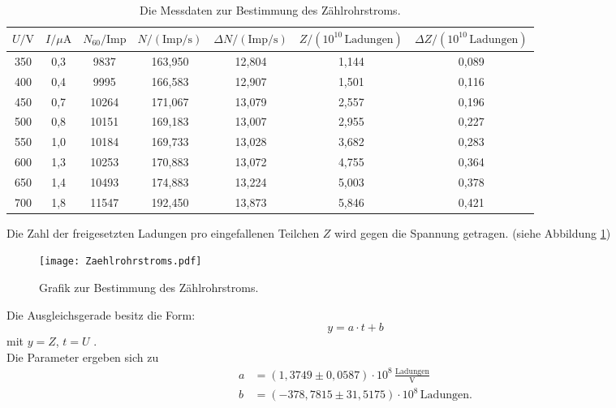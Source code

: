 \begin{table}[H]
  \centering
  \caption{Die Messdaten zur Bestimmung des Zählrohrstroms.}
  \label{tab:Zählrohrstroms}
  \begin{tabular}{| c | c |c|c|c|c|c| }
  \toprule
  $U/\mathrm{V}$ &$I/\mu \text{A} $& $N_{60}/\mathrm{Imp}$ & $N/\mathrm{(Imp/s)}$&$\Delta N/\mathrm{(Imp/s)}$ &$Z/\mathrm{(10^{10}\, Ladungen)}$&$\Delta Z/\mathrm{(10^{10}\, Ladungen)}$\\
  \midrule
  350&	0,3&	9837	&163,950	&12,804	&1,144	&0,089\\ 
  400&	0,4&	9995	&166,583	&12,907	&1,501	&0,116\\
  450&	0,7&	10264&	171,067&	13,079&	2,557&	0,196\\
  500&	0,8&	10151&	169,183&	13,007&	2,955&	0,227\\
  550&	1,0& 10184&	169,733&	13,028&	3,682&	0,283\\
  600&	1,3&	10253&	170,883&	13,072&	4,755&	0,364\\
  650&	1,4&	10493&	174,883&	13,224&	5,003&	0,378\\
  700&	1,8&	11547&	192,450&	13,873&	5,846&	0,421\\
  

  \bottomrule
  \end{tabular}
\end{table}
\noindent
Die Zahl der freigesetzten Ladungen pro eingefallenen Teilchen $Z$ wird gegen die Spannung getragen. (siehe Abbildung \ref{fig:Zaehlrohrstroms})
\begin{figure}[H]
  \centering
  \texttt{[image: Zaehlrohrstroms.pdf]}
  \caption{Grafik zur Bestimmung des Zählrohrstroms.}
  \label{fig:Zaehlrohrstroms}
\end{figure}
\noindent
Die Ausgleichsgerade besitz die Form:
\begin{equation}
 y=a\cdot t+b 
\end{equation}
mit \(y=Z\), \(t=U\) .\\
Die Parameter ergeben sich zu
\begin{align*}
  a &=(1,3749 \pm 0,0587)\cdot 10^8\,\mathrm{\frac{Ladungen}{V}} \\
  b &=(-378,7815 \pm 31,5175)\cdot 10^8\,\mathrm{Ladungen} .\\
 \end{align*}



\label{sec:Auswertung}
